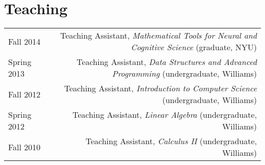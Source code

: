 \documentclass[12pt]{my_cv}
\begin{document}
\section{Teaching}
\begin{tabular}{L R}
Fall 2014&Teaching Assistant, \emph{Mathematical Tools for Neural and Cognitive Science} (graduate, NYU)\\ [0.5ex]
Spring 2013&Teaching Assistant, \emph{Data Structures and Advanced Programming} (undergraduate, Williams)\\[0.5ex]
Fall 2012&Teaching Assistant, \emph{Introduction to Computer Science} (undergraduate, Williams)\\[0.5ex]
Spring 2012&Teaching Assistant, \emph{Linear Algebra} (undergraduate, Williams)\\[0.5ex]
Fall 2010&Teaching Assistant, \emph{Calculus II} (undergraduate, Williams)\\[0.5ex]
\end{tabular}
\end{document}
